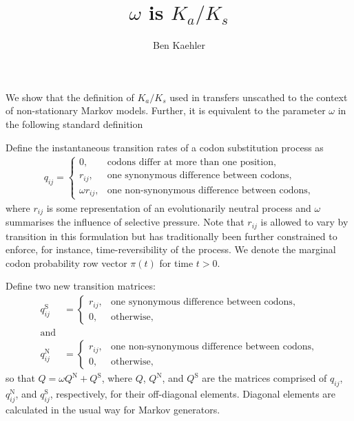 \documentclass[a4paper,oneside,12pt]{article}
\begin{document}
\title{$\omega$ is $K_a/K_s$}
\author{Ben Kaehler}
\maketitle
We show that the definition of $K_a/K_s$ used in \citet*{goldman1994codon} transfers unscathed to the context of non-stationary Markov models. Further, it is equivalent to the parameter $\omega$ in the following standard definition \citep*[see, for example,][p.~59]{yang2006computational}

Define the instantaneous transition rates of a codon substitution process as
\begin{align*}
q_{ij} = \begin{cases} 0, &\text{codons differ at more than one position},\\
r_{ij}, &\text{one synonymous difference between codons},\\
\omega r_{ij}, &\text{one non-synonymous difference between codons},\end{cases}
\end{align*}
where $r_{ij}$ is some representation of an evolutionarily neutral process and $\omega$ summarises the influence of selective pressure. Note that $r_{ij}$ is allowed to vary by transition in this formulation but has traditionally been further constrained to enforce, for instance, time-reversibility of the process. We denote the marginal codon probability row vector $\pi(t)$ for time $t>0$.

Define two new transition matrices:
\begin{align*}
q_{ij}^\text{S} &= \begin{cases}
r_{ij}, &\text{one synonymous difference between codons},\\
0, &\text{otherwise},\end{cases} \\
\text{and} \\
q_{ij}^\text{N} &= \begin{cases}
r_{ij}, &\text{one non-synonymous difference between codons},\\
0, &\text{otherwise},\end{cases}
\end{align*}
so that $Q = \omega Q^\text{N} + Q^\text{S}$, where $Q$, $Q^\text{N}$, and $Q^\text{S}$ are the matrices comprised of $q_{ij}$, $q_{ij}^\text{N}$, and $q_{ij}^\text{S}$, respectively, for their off-diagonal elements. Diagonal elements are calculated in the usual way for Markov generators.
\end{document}
